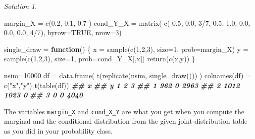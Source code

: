 \documentclass[
]{book}
\newenvironment{Shaded}{\begin{snugshade}}{\end{snugshade}}
\newcommand{\AttributeTok}[1]{\textcolor[rgb]{0.77,0.63,0.00}{#1}}
\newcommand{\ConstantTok}[1]{\textcolor[rgb]{0.00,0.00,0.00}{#1}}
\newcommand{\ControlFlowTok}[1]{\textcolor[rgb]{0.13,0.29,0.53}{\textbf{#1}}}
\newcommand{\DecValTok}[1]{\textcolor[rgb]{0.00,0.00,0.81}{#1}}
\newcommand{\DocumentationTok}[1]{\textcolor[rgb]{0.56,0.35,0.01}{\textbf{\textit{#1}}}}
\newcommand{\FloatTok}[1]{\textcolor[rgb]{0.00,0.00,0.81}{#1}}
\newcommand{\FunctionTok}[1]{\textcolor[rgb]{0.00,0.00,0.00}{#1}}
\newcommand{\NormalTok}[1]{#1}
\newcommand{\OtherTok}[1]{\textcolor[rgb]{0.56,0.35,0.01}{#1}}
\newcommand{\SpecialCharTok}[1]{\textcolor[rgb]{0.00,0.00,0.00}{#1}}
\newcommand{\StringTok}[1]{\textcolor[rgb]{0.31,0.60,0.02}{#1}}
\theoremstyle{definition}
\theoremstyle{definition}
\theoremstyle{definition}
\theoremstyle{definition}
\theoremstyle{remark}
\newtheorem*{solution}{Solution}
\begin{document}
\begin{solution}
~

\begin{Shaded}
\begin{Highlighting}[]
\NormalTok{margin\_X }\OtherTok{=} \FunctionTok{c}\NormalTok{(}\FloatTok{0.2}\NormalTok{, }\FloatTok{0.1}\NormalTok{, }\FloatTok{0.7}\NormalTok{ )}
\NormalTok{cond\_Y\_X }\OtherTok{=} \FunctionTok{matrix}\NormalTok{(}
   \FunctionTok{c}\NormalTok{( }\FloatTok{0.5}\NormalTok{, }\FloatTok{0.0}\NormalTok{, }\DecValTok{3}\SpecialCharTok{/}\DecValTok{7}\NormalTok{,}
      \FloatTok{0.5}\NormalTok{, }\FloatTok{1.0}\NormalTok{, }\FloatTok{0.0}\NormalTok{,}
      \FloatTok{0.0}\NormalTok{, }\FloatTok{0.0}\NormalTok{, }\DecValTok{4}\SpecialCharTok{/}\DecValTok{7}\NormalTok{),}
   \AttributeTok{byrow=}\ConstantTok{TRUE}\NormalTok{,}
   \AttributeTok{nrow=}\DecValTok{3}\NormalTok{)}

\NormalTok{single\_draw }\OtherTok{=} \ControlFlowTok{function}\NormalTok{() \{}
\NormalTok{   x }\OtherTok{=} \FunctionTok{sample}\NormalTok{(}\FunctionTok{c}\NormalTok{(}\DecValTok{1}\NormalTok{,}\DecValTok{2}\NormalTok{,}\DecValTok{3}\NormalTok{), }\AttributeTok{size=}\DecValTok{1}\NormalTok{, }\AttributeTok{prob=}\NormalTok{margin\_X)}
\NormalTok{   y }\OtherTok{=} \FunctionTok{sample}\NormalTok{(}\FunctionTok{c}\NormalTok{(}\DecValTok{1}\NormalTok{,}\DecValTok{2}\NormalTok{,}\DecValTok{3}\NormalTok{), }\AttributeTok{size=}\DecValTok{1}\NormalTok{, }\AttributeTok{prob=}\NormalTok{cond\_Y\_X[,x])}
   \FunctionTok{return}\NormalTok{(}\FunctionTok{c}\NormalTok{(x,y))}
\NormalTok{\}}

\NormalTok{nsim}\OtherTok{=}\DecValTok{10000}
\NormalTok{df }\OtherTok{=} \FunctionTok{data.frame}\NormalTok{(}
   \FunctionTok{t}\NormalTok{(}\FunctionTok{replicate}\NormalTok{(nsim, }\FunctionTok{single\_draw}\NormalTok{()))}
\NormalTok{)}
\FunctionTok{colnames}\NormalTok{(df) }\OtherTok{=} \FunctionTok{c}\NormalTok{(}\StringTok{"x"}\NormalTok{,}\StringTok{"y"}\NormalTok{)}
\FunctionTok{t}\NormalTok{(}\FunctionTok{table}\NormalTok{(df))}
\DocumentationTok{\#\#    x}
\DocumentationTok{\#\# y      1    2    3}
\DocumentationTok{\#\#   1  962    0 2963}
\DocumentationTok{\#\#   2 1012 1023    0}
\DocumentationTok{\#\#   3    0    0 4040}
\end{Highlighting}
\end{Shaded}

The variables \texttt{margin\_X} and \texttt{cond\_X\_Y} are what you get when you compute the marginal and the conditional distribution from the given joint-distribution table as you did in your probability class.


\end{solution}
\end{document}
